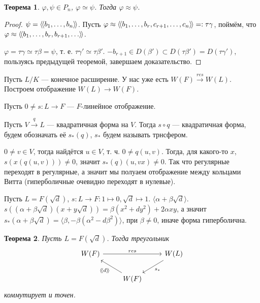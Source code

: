 \documentclass{article}
\newenvironment{cd}{\begin{equation*}\begin{tikzcd}}{\end{tikzcd}\end{equation*}}
\newtheorem*{theorem}{Теорема}
\theoremstyle{definition}
\theoremstyle{remark}
\newcommand{\llangle}{\langle \hspace{-.5mm} \langle}
\newcommand{\rrangle}{\rangle \hspace{-.5mm} \rangle}
\begin{document}
\begin{theorem}
    $\varphi, \psi \in P_n$, $\varphi \simeq \psi$. Тогда $\varphi \approx \psi$.
\end{theorem}
\begin{proof}
    $\psi = \llangle b_1, \ldots, b_n \rrangle$. Пусть $\varphi \approx \llangle b_1, \ldots, b_r, c_{r + 1}, \ldots, c_n \rrangle =: \tau \gamma$, поймём, что $\varphi \approx \llangle b_1, \ldots, b_r, b_{r + 1}, \ldots \rrangle$.
    
    $\varphi = \tau \gamma \simeq \tau \beta = \psi$, т. е. $\tau \gamma' \simeq \tau \beta'$. $-b_{r + 1} \in D(\beta') \subset D(\tau\beta') = D(\tau\gamma')$, пользуясь предыдущей теоремой, завершаем доказательство.
\end{proof}

Пусть $L / K$ --- конечное расширение. У нас уже есть $W(F) \xrightarrow{res} W(L)$. Построем отображение $W(L) \rightarrow W(F)$.

Пусть $0 \neq s: L \rightarrow F$ --- $F$-линейное отображение.

Пусть $V \xrightarrow{q} L$ --- квадратичная форма на $V$. Тогда $s \circ q$ --- квадратичная форма, будем обозначать её $s_*(q)$, $s_*$ будем называть трнсфером.

$0 \neq v \in V$, тогда найдётся $u \in V$, т. ч. $0 \neq q(u, v)$. Тогда, для какого-то $x$, $s(x(q(u, v))) \neq 0$, значит $s_*(q)(u, vx) \neq 0$. Так что регулярные переходят в регулярные, а значит мы полуаем отображение между кольцами Витта (гиперболичные очевидно переходят в нулевые).

Пусть $L = F(\sqrt{d})$, $s: L \rightarrow F: 1 \mapsto 0, \sqrt{d} \mapsto 1$. $\langle \alpha + \beta\sqrt{d} \rangle$. $s((\alpha + \beta \sqrt{d})(x + y \sqrt{d})) = \beta(x^2 + dy^2) + 2\alpha xy$, а значит $s_*(\alpha + \beta\sqrt{d}) = \langle \beta, - \beta(\alpha^2 - d \beta^2) \rangle$, при $\beta \neq 0$, иначе форма гиперболична.

\begin{theorem}
    Пусть $L = F(\sqrt{d})$. Тогда треугольник
    \begin{cd}
        W(F) \ar[rr, "res"] & & W(L) \ar[dl, "s_*"] \\
        & W(F) \ar[ul, "\llangle d \rrangle"]
    \end{cd}
    коммутирует и точен.
\end{theorem}
\end{document}
